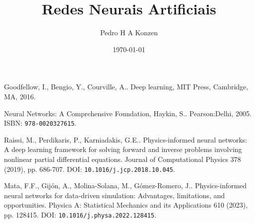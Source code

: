 \documentclass[12pt]{book}
\begin{document}
\frontmatter

\title{Redes Neurais Artificiais}
\author{Pedro H A Konzen}
\date{\today}
\ifishtml
\else
{}
\fi

\maketitle





\tableofcontents
{}

\mainmatter





\ifisbook

\fi

\ifisbook
\clearpage
{}
{}
\fi

\begin{thebibliography}{99}
  Goodfellow, I., Bengio, Y., Courville, A.. Deep learning, {MIT} Press, Cambridge, {MA}, 2016.

  Neural Networks: A Comprehensive Foundation, Haykin, S.. Pearson:Delhi, 2005. ISBN: \texttt{978-0020327615}.

  Raissi, M., Perdikaris, P., Karniadakis, G.E.. Physics-informed neural networks: A deep learning framework for solving forward and inverse problems involving nonlinear partial differential equations. Journal of Computational Physics 378 (2019), pp. 686-707. DOI: \texttt{10.1016/j.jcp.2018.10.045}.

  Mata, F.F., Gijón, A., Molina-Solana, M., Gómez-Romero, J.. Physics-informed neural networks for data-driven simulation: Advantages, limitations, and opportunities. Physica A: Statistical Mechanics and its Applications 610 (2023), pp. 128415. DOI: \texttt{10.1016/j.physa.2022.128415}.

\end{thebibliography}
\end{document}
